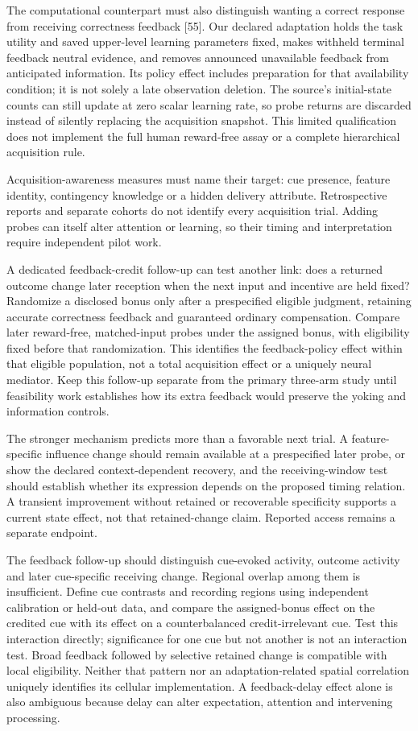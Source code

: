 \documentclass[
  american,
  11pt,
  letterpaper,
]{article}
\begin{document}
The computational counterpart must also distinguish wanting a correct response from receiving correctness feedback {[}55{]}. Our declared adaptation holds the task utility and saved upper-level learning parameters fixed, makes withheld terminal feedback neutral evidence, and removes announced unavailable feedback from anticipated information. Its policy effect includes preparation for that availability condition; it is not solely a late observation deletion. The source's initial-state counts can still update at zero scalar learning rate, so probe returns are discarded instead of silently replacing the acquisition snapshot. This limited qualification does not implement the full human reward-free assay or a complete hierarchical acquisition rule.

Acquisition-awareness measures must name their target: cue presence, feature identity, contingency knowledge or a hidden delivery attribute. Retrospective reports and separate cohorts do not identify every acquisition trial. Adding probes can itself alter attention or learning, so their timing and interpretation require independent pilot work.

A dedicated feedback-credit follow-up can test another link: does a returned outcome change later reception when the next input and incentive are held fixed? Randomize a disclosed bonus only after a prespecified eligible judgment, retaining accurate correctness feedback and guaranteed ordinary compensation. Compare later reward-free, matched-input probes under the assigned bonus, with eligibility fixed before that randomization. This identifies the feedback-policy effect within that eligible population, not a total acquisition effect or a uniquely neural mediator. Keep this follow-up separate from the primary three-arm study until feasibility work establishes how its extra feedback would preserve the yoking and information controls.

The stronger mechanism predicts more than a favorable next trial. A feature-specific influence change should remain available at a prespecified later probe, or show the declared context-dependent recovery, and the receiving-window test should establish whether its expression depends on the proposed timing relation. A transient improvement without retained or recoverable specificity supports a current state effect, not that retained-change claim. Reported access remains a separate endpoint.

The feedback follow-up should distinguish cue-evoked activity, outcome activity and later cue-specific receiving change. Regional overlap among them is insufficient. Define cue contrasts and recording regions using independent calibration or held-out data, and compare the assigned-bonus effect on the credited cue with its effect on a counterbalanced credit-irrelevant cue. Test this interaction directly; significance for one cue but not another is not an interaction test. Broad feedback followed by selective retained change is compatible with local eligibility. Neither that pattern nor an adaptation-related spatial correlation uniquely identifies its cellular implementation. A feedback-delay effect alone is also ambiguous because delay can alter expectation, attention and intervening processing.
\end{document}
